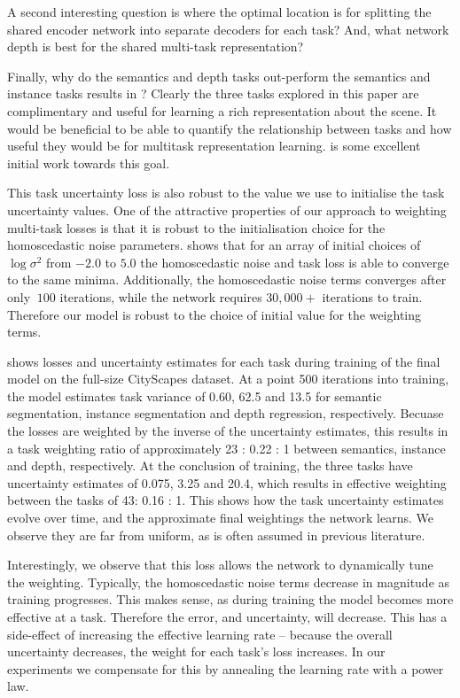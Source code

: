 A second interesting question is where the optimal location is for splitting the shared encoder network into separate decoders for each task? And, what network depth is best for the shared multi-task representation?

Finally, why do the semantics and depth tasks out-perform the semantics and instance tasks results in ? Clearly the three tasks explored in this paper are complimentary and useful for learning a rich representation about the scene. It would be beneficial to be able to quantify the relationship between tasks and how useful they would be for multitask representation learning. \citep{zamir2018taskonomy} is some excellent initial work towards this goal.



This task uncertainty loss is also robust to the value we use to initialise the task uncertainty values.
One of the attractive properties of our approach to weighting multi-task losses is that it is robust to the initialisation choice for the homoscedastic noise parameters.  shows that for an array of initial choices of $\log \sigma^2$ from $-2.0$ to $5.0$ the homoscedastic noise and task loss is able to converge to the same minima. Additionally, the homoscedastic noise terms converges after only $~100$ iterations, while the network requires $30,000+$ iterations to train. Therefore our model is robust to the choice of initial value for the weighting terms.

 shows losses and uncertainty estimates for each task during training of the final model on the full-size CityScapes dataset. At a point 500 iterations into training, the model estimates task variance of 0.60, 62.5 and 13.5 for semantic segmentation, instance segmentation and depth regression, respectively. Becuase the losses are weighted by the inverse of the uncertainty estimates, this results in a task weighting ratio of approximately 23 : 0.22 : 1 between semantics, instance and depth, respectively. At the conclusion of training, the three tasks have uncertainty estimates of 0.075, 3.25 and 20.4, which results in effective weighting between the tasks of 43: 0.16 : 1. This shows how the task uncertainty estimates evolve over time, and the approximate final weightings the network learns. We observe they are far from uniform, as is often assumed in previous literature.

Interestingly, we observe that this loss allows the network to dynamically tune the weighting. Typically, the homoscedastic noise terms decrease in magnitude as training progresses. This makes sense, as during training the model becomes more effective at a task. Therefore the error, and uncertainty, will decrease. This has a side-effect of increasing the effective learning rate -- because the overall uncertainty decreases, the weight for each task's loss increases. In our experiments we compensate for this by annealing the learning rate with a power law.

